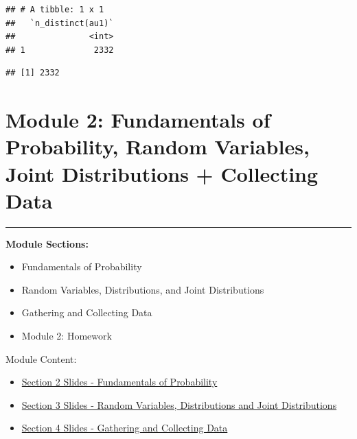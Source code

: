 \documentclass[]{book}
\newenvironment{Shaded}{\begin{snugshade}}{\end{snugshade}}
\newcommand{\KeywordTok}[1]{\textcolor[rgb]{0.13,0.29,0.53}{\textbf{#1}}}
\newcommand{\CommentTok}[1]{\textcolor[rgb]{0.56,0.35,0.01}{\textit{#1}}}
\newcommand{\OperatorTok}[1]{\textcolor[rgb]{0.81,0.36,0.00}{\textbf{#1}}}
\newcommand{\NormalTok}[1]{#1}
\providecommand{\tightlist}{%
  \setlength{\itemsep}{0pt}\setlength{\parskip}{0pt}}
\theoremstyle{definition}
\theoremstyle{definition}
\theoremstyle{definition}
\theoremstyle{remark}
\begin{document}
\begin{verbatim}
## # A tibble: 1 x 1
##   `n_distinct(au1)`
##               <int>
## 1              2332
\end{verbatim}

\begin{Shaded}
\end{Shaded}

\begin{verbatim}
## [1] 2332
\end{verbatim}

\chapter{Module 2: Fundamentals of Probability, Random Variables, Joint
Distributions + Collecting
Data}\label{module-2-fundamentals-of-probability-random-variables-joint-distributions-collecting-data}

\begin{center}\rule{0.5\linewidth}{\linethickness}\end{center}

\textbf{Module Sections:}

\begin{itemize}
\tightlist
\item
  Fundamentals of Probability
\item
  Random Variables, Distributions, and Joint Distributions
\item
  Gathering and Collecting Data
\item
  Module 2: Homework
\end{itemize}

Module Content:

\begin{itemize}
\tightlist
\item
  \href{./files/M1/Lecture_Slides_02.pdf}{Section 2 Slides -
  Fundamentals of Probability}
\item
  \href{./files/M1/Lecture_Slides_03.pdf}{Section 3 Slides - Random
  Variables, Distributions and Joint Distributions}
\item
  \href{./files/M1/Gathering_Data.pdf}{Section 4 Slides - Gathering and
  Collecting Data}
\end{itemize}
\end{document}
